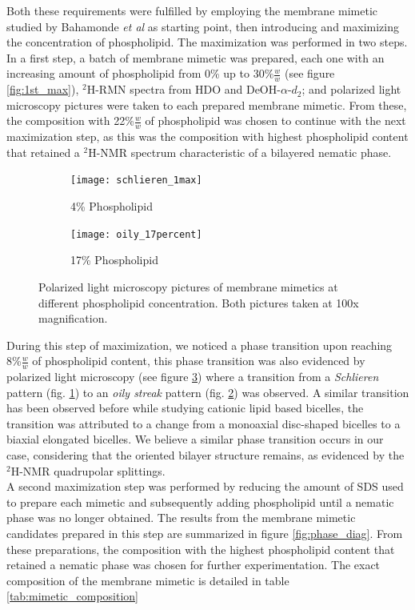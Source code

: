 \documentclass[3p,preprint,review]{elsarticle}
\begin{document}
	Both these requirements were fulfilled by employing the membrane mimetic
	studied by Bahamonde \textit{et al}\cite{Bahamonde-Padilla2013} as starting
	point, then introducing and maximizing the concentration of phospholipid. The
	maximization was performed in two steps. In a first step,
	a batch of membrane mimetic was prepared, each one with an increasing amount
	of
	phospholipid from 0\% up to 30\%$\tfrac{w}{w}$  (see figure \ref{fig:1st_max}),
	$^2$H-RMN
	spectra from HDO and DeOH-$\alpha$-$d_2$; and polarized light microscopy
	pictures were taken to each prepared
	membrane mimetic. From these, the composition with 22\%$\tfrac{w}{w}$ of
	phospholipid was
	chosen to continue with the next maximization step, as this was the composition
	with highest phospholipid content that retained a $^2$H-NMR spectrum
	characteristic of a bilayered nematic phase.\\
	\begin{figure}[h]
		\centering
		\begin{subfigure}{0.45\columnwidth}
			\texttt{[image: schlieren\_1max]}
			\caption{4\% Phospholipid}
			\label{fig:schlieren}
		\end{subfigure}
		\begin{subfigure}{0.45\columnwidth}
			\texttt{[image: oily\_17percent]}
			\caption{17\% Phospholipid}
			\label{fig:oily}
		\end{subfigure}
		\caption{Polarized light microscopy pictures of membrane mimetics at different
			phospholipid concentration. Both pictures taken at 100x magnification.}
		\label{fig:plm}
	\end{figure}
	During this step of maximization, we noticed a phase transition upon reaching
	8\%$\tfrac{w}{w}$ of phospholipid content, this phase transition was also
	evidenced by
	polarized light microscopy (see figure \ref{fig:plm}) where a transition from a
	\textit{Schlieren} pattern (fig. \ref{fig:schlieren}) to an \textit{oily
		streak}
	pattern (fig. \ref{fig:oily}) was observed. A similar transition has been
	observed before while studying cationic lipid based
	bicelles\cite{ruiz2016effect},
	the transition was attributed to a change from a monoaxial disc-shaped bicelles
	to a biaxial elongated bicelles. We believe a similar phase transition occurs
	in our
	case, considering that the oriented bilayer structure remains, as evidenced by
	the $^2$H-NMR quadrupolar splittings.\\
	
	A second maximization step was performed by reducing the amount of SDS used to
	prepare each mimetic and subsequently adding phospholipid until a nematic phase
	was no longer obtained. The results from the membrane mimetic candidates
	prepared in this step are summarized in figure \ref{fig:phase_diag}. From these
	preparations, the composition with the highest phospholipid content that
	retained a nematic phase was chosen for further experimentation. The exact
	composition of the membrane mimetic is detailed in table
	\ref{tab:mimetic_composition}
	
\end{document}
